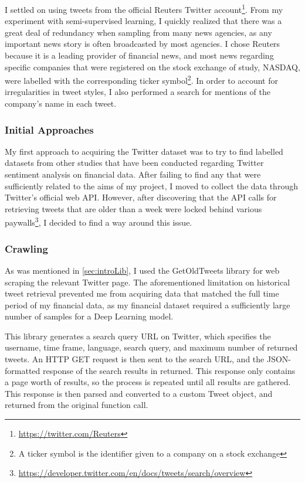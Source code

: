 \documentclass[12pt,a4paper,twoside,openright]{report}
\begin{document}
I settled on using tweets from the official Reuters Twitter account\footnote{\url{https://twitter.com/Reuters}}.
From my experiment with semi-supervised learning, I quickly realized that there was a great deal of redundancy
when sampling from many news agencies, as any important news story is often broadcasted by most agencies.
I chose Reuters because it is a leading provider of financial news, and
most news regarding specific companies that were registered on the stock exchange of
study, NASDAQ, were labelled with the corresponding ticker symbol\footnote{A ticker symbol is the identifier given to a company on
a stock exchange}. In order to account for irregularities in tweet styles,
I also performed a search for mentions of the company's name in each tweet.

\subsubsection{Initial Approaches}
My first approach to acquiring the Twitter dataset was to try to find labelled datasets from other studies
that have been conducted regarding Twitter sentiment analysis on financial data. After failing to find any that 
were sufficiently related to the aims of my project, I moved to collect the data through Twitter's official web API.
However, after discovering that the API calls for retrieving tweets that are older than a week were locked
behind various paywalls\footnote{\url{https://developer.twitter.com/en/docs/tweets/search/overview}}, I decided to find a way around this issue.

\subsubsection{Crawling}
\label{sec:impCrawl}

As was mentioned in \cref{sec:introLib}, I used the GetOldTweets library for web scraping the relevant Twitter page.
The aforementioned limitation on historical tweet retrieval prevented me from acquiring data that matched the 
full time period of my financial data, as my financial dataset required a sufficiently large number of samples 
for a Deep Learning model.

This library generates a search query URL on Twitter, which specifies the username, time frame, language,
search query, and maximum number of returned tweets. An HTTP GET request is then sent to the search URL,
and the JSON-formatted response of the search results in returned. This response only contains a page
worth of results, so the process is repeated until all results are gathered. This response is then parsed and
converted to a custom Tweet object, and returned from the original function call.
\end{document}
